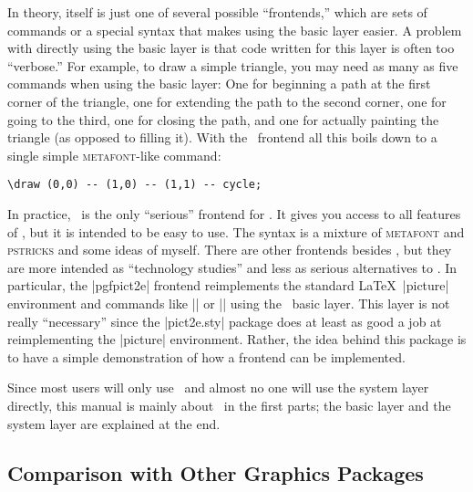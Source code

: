 In theory, \tikzname itself is just one of several possible
``frontends,'' which are sets of commands or a special syntax that
makes using the basic layer easier. A problem with directly using the
basic layer is that code written for this layer is often too
``verbose.'' For example, to draw a simple 
triangle, you may need as many as five commands when using the basic
layer: One for beginning a path at the first corner of the triangle,
one for extending the path to the second corner, one for going to
the third, one for closing the path, and one for actually painting
the triangle (as opposed to filling it). With the \tikzname\ frontend
all this boils down to a single simple \textsc{metafont}-like
command:
\begin{verbatim}
\draw (0,0) -- (1,0) -- (1,1) -- cycle;
\end{verbatim}

In practice, \tikzname\ is the only ``serious'' frontend for \pgfname. It
gives you access to all features of \pgfname, but it is intended to be
easy to use. The syntax is a mixture of \textsc{metafont} and
\textsc{pstricks} and some ideas of myself. There are other frontends
besides \tikzname, but they are more intended as ``technology
studies'' and less as serious alternatives to \tikzname. In
particular, the |pgfpict2e| frontend   reimplements the standard
\LaTeX\ |{picture}|  environment and 
commands like |\line| or |\vector| 
using the \pgfname\ basic layer. This layer is not really ``necessary''
since the |pict2e.sty| package does at least as good a job at
reimplementing the |{picture}| environment. Rather, the idea
behind this package is to have a simple demonstration of how a
frontend can be implemented. 

Since most users will only use \tikzname\ and almost no one will use
the system layer directly, this manual is mainly about \tikzname\ in
the first parts; the basic layer and the system layer are explained at
the end.


\subsection{Comparison with Other Graphics Packages}

